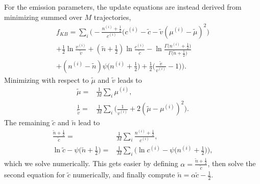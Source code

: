 For the emission parameters, the update equations are instead derived
from minimizing  summed over $M$ trajectories,
\begin{multline}
  f_{KB}=\sum_i\Bigg(
  -\frac{n^{(i)}+\frac 12}{c^{(i)}} \Big(c^{(i)}-\tilde c-\tilde v(\mu^{(i)}-\tilde
  \mu)^2\Big)\\ +\frac 12\ln\frac{v^{(i)}}{\tilde v} +(\tilde
  n+\frac 12)\ln\frac{c^{(i)}}{\tilde c}
  -\ln\frac{\Gamma\big(n^{(i)}+\frac 12\big)}{\Gamma\big(\tilde n+\frac
    12\big)}\\ +(n^{(i)}-\tilde n)\psi\big(n^{(i)}+\frac 12\big)
  +\frac{1}{2}\Big(\frac{\tilde v}{v^{(i)}} -1\Big)\Bigg).
\end{multline}
Minimizing with respect to $\tilde\mu$ and $\tilde v$ leads to
\begin{align}
   \tilde\mu=&\frac{1}{M}\sum_i\mu^{(i)},\\
   \frac{1}{\tilde v}=&
   \frac{1}{M}\sum_i\Big(\frac{1}{v^{(i)}}+2(\tilde\mu-\mu^{(i)})^2\Big).
\end{align}
The remaining $\tilde c$ and $\tilde n$ lead to
\begin{align}
  \frac{\tilde n+\frac 12}{\tilde c}=&
  \frac{1}{M}\sum_i\frac{n^{(i)}+\frac 12}{c^{(i)}},\\
  \ln\tilde c-\psi\big(\tilde n+\frac 12\big)=&
  \frac{1}{M}\sum_i\bigg(
\ln c^{(i)}-\psi\big(n^{(i)}+\frac 12\big)\bigg),
\end{align}
which we solve numerically. This gets easier by defining
$\alpha=\frac{\tilde n+\frac 12}{\tilde c}$, then solve the second
equation for $\tilde c$ numerically, and finally compute $\tilde
n=\alpha\tilde c-\frac 12$.
